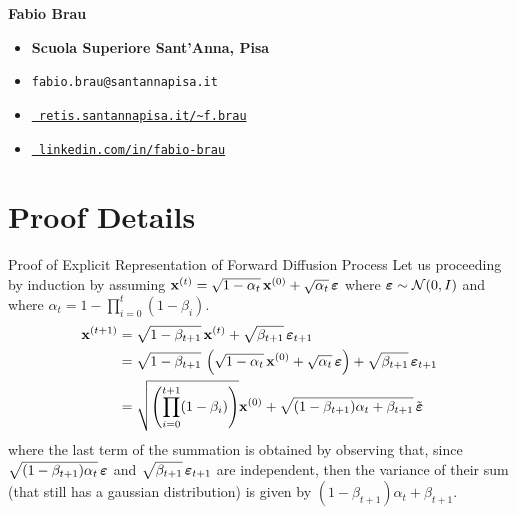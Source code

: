 \documentclass[aspectratio=169, 10pt]{beamer}
\theoremstyle{definition}
\begin{document}
{\begin{frame}{}
\begin{minipage}[h]{0.6\textwidth}
  {\large\bf Fabio Brau}
  \vspace{5pt}
  \begin{itemize}
    \item[\faUniversity] {\bf Scuola Superiore Sant'Anna, Pisa}
    \item[\Letter] \texttt{fabio.brau@santannapisa.it}
    \item[\faGlobe] \href{http://retis.santannapisa.it/~f.brau/}{\tt %
                    retis.santannapisa.it/\textasciitilde f.brau}
    \item[\faLinkedin]
      \href{https://www.linkedin.com/in/fabio-brau}{\tt%
        linkedin.com/in/fabio-brau}
  \end{itemize}
  \end{minipage}
\end{frame}
}
\appendix
\section{Proof Details}
\begin{frame}{Proof of Explicit Representation of Forward Diffusion Process}
  Let us proceeding by induction by assuming 
  ${\mathbf{x}}^{(t)} = \sqrt{1-\alpha_t}\, {\mathbf{x}}^{(0)} + \sqrt{\alpha_t}\,{\boldsymbol{\varepsilon}}$
  where ${\boldsymbol{\varepsilon}}\sim\mathcal{N}(0,I)$ and where $\alpha_t =
  1-\prod_{i=0}^t(1-\beta_i)$. 
  \begin{equation}
    \begin{aligned}
      {\mathbf{x}}^{(t+1)} &=  \sqrt{1-\beta_{t+1}}\, {\mathbf{x}}^{(t)} +
      \sqrt{\beta_{t+1}}\,{\boldsymbol{\varepsilon}}_{t+1}\\
      &=\sqrt{1-\beta_{t+1}}\, \left(
      \sqrt{1-\alpha_t}\, {\mathbf{x}}^{(0)} + \sqrt{\alpha_t}\,{\boldsymbol{\varepsilon}}\right) +
      \sqrt{\beta_{t+1}}\,{\boldsymbol{\varepsilon}}_{t+1}\\
      &= \sqrt{\left( \prod_{i=0}^{t+1}(1-\beta_i) \right)}{\mathbf{x}}^{(0)} +
      \sqrt{(1-\beta_{t+1})\alpha_t+\beta_{t+1}}\,\tilde{{\boldsymbol{\varepsilon}}}
    \end{aligned}
  \end{equation}
    where the last term of the summation is obtained by observing that, since
    $\sqrt{(1-\beta_{t+1})\alpha_t}\,{\boldsymbol{\varepsilon}}$ and $\sqrt{\beta_{t+1}}\,{\boldsymbol{\varepsilon}}_{t+1}$ 
      are independent, then the variance of their sum (that still has a
      gaussian distribution) is given by
      $(1-\beta_{t+1})\alpha_t+ \beta_{t+1}$.
\end{frame}
\end{document}
